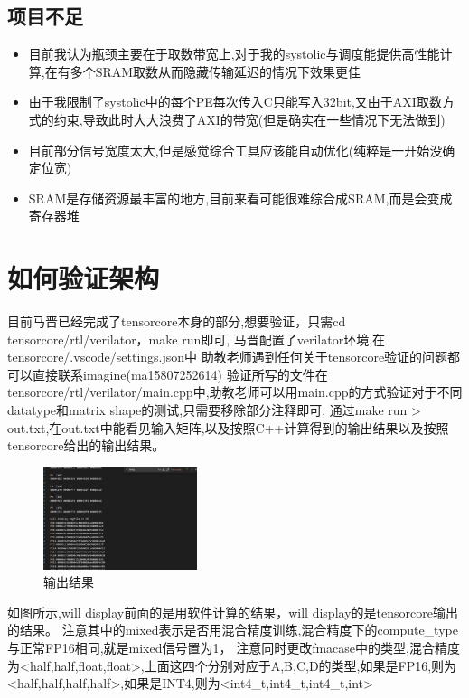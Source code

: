 \documentclass[zihao=-4, UTF8]{ctexart}
\begin{document}
\subsection{项目不足}
\begin{itemize}
    \item 目前我认为瓶颈主要在于取数带宽上,对于我的systolic与调度能提供高性能计算,在有多个SRAM取数从而隐藏传输延迟的情况下效果更佳
    \item 由于我限制了systolic中的每个PE每次传入C只能写入32bit,又由于AXI取数方式的约束,导致此时大大浪费了AXI的带宽(但是确实在一些情况下无法做到)
    \item 目前部分信号宽度太大,但是感觉综合工具应该能自动优化(纯粹是一开始没确定位宽)
    \item SRAM是存储资源最丰富的地方,目前来看可能很难综合成SRAM,而是会变成寄存器堆
\end{itemize}

\section{如何验证架构}
目前马晋已经完成了tensorcore本身的部分,想要验证，只需cd tensorcore/rtl/verilator，make run即可,
马晋配置了verilator环境,在tensorcore/.vscode/settings.json中
助教老师遇到任何关于tensorcore验证的问题都可以直接联系imagine(ma15807252614)
验证所写的文件在tensorcore/rtl/verilator/main.cpp中,助教老师可以用main.cpp的方式验证对于不同datatype和matrix shape的测试,只需要移除部分注释即可,
通过make run > out.txt,在out.txt中能看见输入矩阵,以及按照C++计算得到的输出结果以及按照tensorcore给出的输出结果。
\begin{figure}[H]
      \centering
      \includegraphics[width=0.4\textwidth]{image.png}
      \caption{输出结果}
      \label{fig:输出结果}
    \end{figure}
如图所示,will display前面的是用软件计算的结果，will display的是tensorcore输出的结果。
注意其中的mixed表示是否用混合精度训练,混合精度下的compute\_type与正常FP16相同,就是mixed信号置为1，
注意同时更改fmacase中的类型,混合精度为<half,half,float,float>,上面这四个分别对应于A,B,C,D的类型,如果是FP16,则为<half,half,half,half>,如果是INT4,则为<int4\_t,int4\_t,int4\_t,int>
\end{document}
